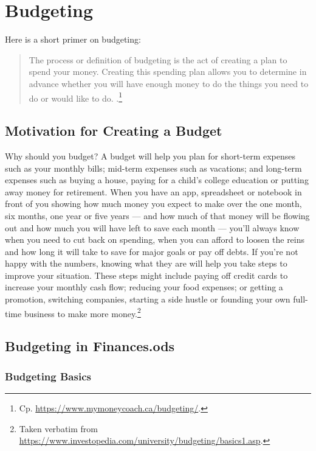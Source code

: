 \section{Budgeting}
\label{section:Budgeting}

Here is a short primer on budgeting:
\begin{quote}\small
	The process or definition of budgeting is the act of creating a plan to spend your money.
	Creating this spending plan allows you to determine in advance whether you will have enough money to do the things you need to do or would like to do. .\footnote{Cp. \url{https://www.mymoneycoach.ca/budgeting/}.}
\end{quote}

\subsection{Motivation for Creating a Budget}
\label{subsec:motivation-creating-budget}

Why should you budget? A budget will help you plan for short-term expenses such as your monthly bills; mid-term expenses such as vacations; and long-term expenses such as buying a house, paying for a child’s college education or putting away money for retirement.
When you have an app, spreadsheet or notebook in front of you showing how much money you expect to make over the one month, six months, one year or five years --- and how much of that money will be flowing out and how much you will have left to save each month --- you’ll always know when you need to cut back on spending, when you can afford to loosen the reins and how long it will take to save for major goals or pay off debts.
If you’re not happy with the numbers, knowing what they are will help you take steps to improve your situation.
These steps might include paying off credit cards to increase your monthly cash flow; reducing your food expenses; or getting a promotion, switching companies, starting a side hustle or founding your own full-time business to make more money.\footnote{Taken verbatim from \url{https://www.investopedia.com/university/budgeting/basics1.asp}.}

\subsection{Budgeting in Finances.ods}
\label{subsec:budgeting-in-finances.ods}

\subsubsection{Budgeting Basics}
\label{subsubsec:budgeting-basics}

